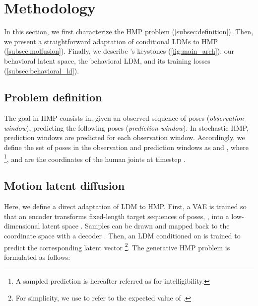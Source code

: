 \documentclass[10pt,twocolumn,letterpaper]{article}
\begin{document}
\def\encoder{\mathcal{E}}
\def\decoder{\mathcal{D}}
\def\ldFunction{f_{\Phi}}
\def\latcode{z}
\def\diffused{\latcode_{t}}
\def\diffusedPrev{\latcode_{t-1}}
\def\diffusedStart{\latcode_{0}}

\def\extPred{\pred_{e}}
\def\bvaeEncParams{\theta}
\def\bvaeDecParams{\phi}
\def\bvaeAuxDecParams{\omega}
\def\bvaeXmotionEncParams{\alpha}
\def\bvaeXmotionEnc{g_{\bvaeXmotionEncParams}}
\def\vaeObsEncParams{\lambda}
\def\vaeObsEnc{h_{\vaeObsEncParams}}
\def\bvaeDec{\mathcal{B}_{\bvaeDecParams}}
\def\bvaeEnc{p_{\bvaeEncParams}}
\def\bvaeAuxDec{\mathcal{A}_{\bvaeAuxDecParams}}

\def\lossrec{\mathcal{L}_{rec}}
\def\losslat{\mathcal{L}_{lat}}





\section{Methodology}
\label{sec:methodology}

In this section, we first characterize the HMP problem (\autoref{subsec:definition}). 
Then, we present a straightforward adaptation of conditional LDMs to HMP (\autoref{subsec:molfusion}). Finally, we describe \modelname{}'s keystones (\autoref{fig:main_arch}): our behavioral latent space, the behavioral LDM, and its training losses (\autoref{subsec:behavioral_ld}). 

\subsection{Problem definition}
\label{subsec:definition}

The goal in HMP consists in, given an observed sequence of  poses (\textit{observation window}), predicting the following  poses (\textit{prediction window}). In stochastic HMP,  prediction windows are predicted for each observation window.
Accordingly, we define the set of poses in the observation and prediction windows as  and , where \footnote{A sampled prediction  is hereafter referred as  for intelligibility. }, and  are the coordinates of the human joints at timestep .

\subsection{Motion latent diffusion}
\label{subsec:molfusion}

Here, we define a direct adaptation of LDM to HMP. 
First, a VAE is trained so that an encoder  transforms fixed-length target sequences of  poses, , into a low-dimensional latent space . Samples  can be drawn and mapped back to the coordinate space with a decoder . 
Then, an LDM conditioned on  is trained to predict the corresponding latent vector \footnote{For simplicity, we use  to refer to the expected value of .}. The generative HMP problem is formulated as follows:
\vspace{-0.15cm}
\end{document}

